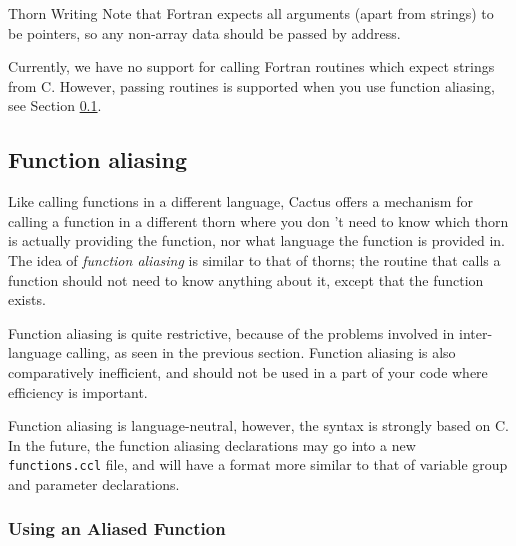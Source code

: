 \begin{cactuspart}{Thorn Writing}
Note that Fortran expects all arguments (apart from strings) to be
pointers, so any non-array data should be passed by address.

Currently, we have no support for calling Fortran routines which expect
strings from C. However, passing routines is supported when you use function aliasing, see Section \ref{sec:function_aliasing}.


\subsection{Function aliasing}
\label{sec:function_aliasing}

Like calling functions in a different language, Cactus offers a
mechanism for calling a function in a different thorn where you don 't need
to know which thorn is actually providing the function, nor what
language the function is provided in. The idea of \textit{function
aliasing} is similar to that of thorns; the routine that calls a
function should not need to know anything about it, except that the
function exists.

Function aliasing is quite restrictive, because of the problems
involved in inter-language calling, as seen in the previous
section. Function aliasing is also comparatively inefficient, and
should not be used in a part of your code where efficiency is
important.

Function aliasing is language-neutral, however, the syntax is strongly
based on C. In the future, the function aliasing
declarations may go into a new \texttt{functions.ccl} file, and will
have a format more similar to that of variable group and parameter
declarations.

\subsubsection{Using an Aliased Function}


\end{cactuspart}
